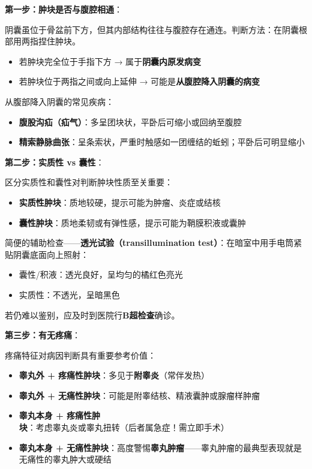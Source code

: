 \vspace{0.5em}
\noindent\textbf{第一步：肿块是否与腹腔相通}：

阴囊虽位于骨盆前下方，但其内部结构往往与腹腔存在通连。判断方法：在阴囊根部用两指捏住肿块。
\begin{itemize}
	\item 若肿块完全位于手指下方 → 属于\textbf{阴囊内原发病变}
	\item 若肿块位于两指之间或向上延伸 → 可能是\textbf{从腹腔降入阴囊的病变}
\end{itemize}

从腹部降入阴囊的常见疾病：
\begin{itemize}
	\item \textbf{腹股沟疝（疝气）}：多呈团块状，平卧后可缩小或回纳至腹腔
	\item \textbf{精索静脉曲张}：呈条索状，严重时触感如一团缠结的蚯蚓；平卧后可明显缩小
\end{itemize}

\vspace{0.5em}
\noindent\textbf{第二步：实质性 vs 囊性}：

区分实质性和囊性对判断肿块性质至关重要：
\begin{itemize}
	\item \textbf{实质性肿块}：质地较硬，提示可能为肿瘤、炎症或结核
	\item \textbf{囊性肿块}：质地柔韧或有弹性感，提示可能为鞘膜积液或囊肿
\end{itemize}

简便的辅助检查——\textbf{透光试验（transillumination test）}：在暗室中用手电筒紧贴阴囊底面向上照射：
\begin{itemize}
	\item 囊性/积液：透光良好，呈均匀的橘红色亮光
	\item 实质性：不透光，呈暗黑色
\end{itemize}

若仍难以鉴别，应及时到医院行\textbf{B超检查}确诊。

\vspace{0.5em}
\noindent\textbf{第三步：有无疼痛}：

疼痛特征对病因判断具有重要参考价值：

\begin{itemize}
	\item \textbf{睾丸外 + 疼痛性肿块}：多见于\textbf{附睾炎}（常伴发热）
	\item \textbf{睾丸外 + 无痛性肿块}：可能是附睾结核、精液囊肿或腺瘤样肿瘤
	\item \textbf{睾丸本身 + 疼痛性肿块}：考虑睾丸炎或睾丸扭转（后者属急症！需立即手术）
	\item \textbf{睾丸本身 + 无痛性肿块}：高度警惕\textbf{睾丸肿瘤}——睾丸肿瘤的最典型表现就是无痛性的睾丸肿大或硬结
\end{itemize}

